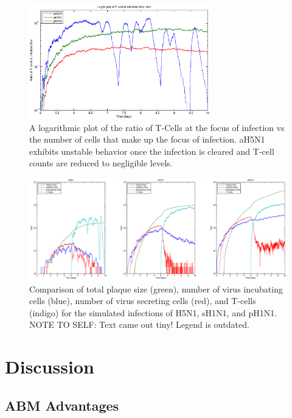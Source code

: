 \documentclass[10pt]{article}
\begin{document}
\begin{figure}[ht!]
\begin{center}
 \includegraphics[width=0.7\textwidth]{tcellratio}
 \end{center}
\caption{A logarithmic plot of the ratio of T-Cells at the focus of infection vs the number of cells that make up the focus of infection.  aH5N1 exhibits unstable behavior once the infection is cleared and T-cell counts are reduced to negligible levels.} 
 \label{fig:tcellratio}
\end{figure}


\begin{figure}[ht!]
\begin{center}
 \includegraphics[width=\textwidth]{plaquesize}
 \end{center}
\caption{Comparison of total plaque size (green), number of virus incubating cells (blue), number of virus secreting cells (red), and T-cells (indigo) for the simulated infections of H5N1, sH1N1, and pH1N1.  NOTE TO SELF: Text came out tiny!  Legend is outdated.} 
 \label{fig:plaquesize}
\end{figure}


\section*{Discussion}

\subsection*{ABM Advantages}
\end{document}
